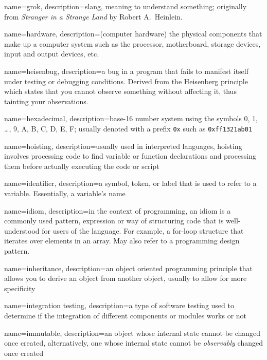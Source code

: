 {
  name=grok,
  description={slang, meaning to understand something; originally from \emph{Stranger in a Strange Land} by Robert A.\ Heinlein.}
}

{
  name=hardware,
  description={(computer hardware) the physical components that make up a computer system such as the processor, motherboard, storage devices, input and output devices, etc.}
}

{
  name=heisenbug,
  description={a bug in a program that fails to manifest itself under testing or debugging conditions.  Derived from the Heisenberg principle which states that you cannot observe something without affecting it, thus tainting your observations.}
}

{
  name=hexadecimal,
  description={base-16 number system using the symbols 0, 1, \ldots, 9, A, B, C, D, E, F; usually denoted with a prefix \texttt{0x} such as
\texttt{0xff1321ab01}}
}


{
  name=hoisting,
  description={usually used in interpreted languages, hoisting involves processing code to find variable or function declarations and processing them before actually executing the code or script}
}

{
  name=identifier,
  description={a symbol, token, or label that is used to refer to a variable.  Essentially, a variable's name}
}

{
  name=idiom,
  description={in the context of programming, an idiom is a commonly used pattern, expression or way of structuring code that is well-understood for users of the language.  For example, a for-loop structure that iterates over elements in an array.  May also refer to a programming design pattern.}
}

{
  name=inheritance,
  description={an object oriented programming principle that allows you to derive an object from another object, usually to allow for more specificity}
}

{
  name=integration testing,
  description={a type of software testing used to determine if the integration of different components or modules works or not}
}


{
  name=immutable,
  description={an object whose internal state cannot be changed once created, alternatively, one whose internal state
  cannot be \emph{observably} changed once created}
}

